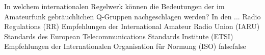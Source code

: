     {In welchem internationalen Regelwerk können die Bedeutungen der im Amateurfunk gebräuchlichen Q-Gruppen nachgeschlagen werden? In den ...}
    {Radio Regulations (RR)}
    {Empfehlungen der International Amateur Radio Union (IARU)}
    {Standards des European Telecommunications Standards Institute (ETSI)}
    {Empfehlungen der Internationalen Organisation für Normung (ISO)}
    {false}{false}